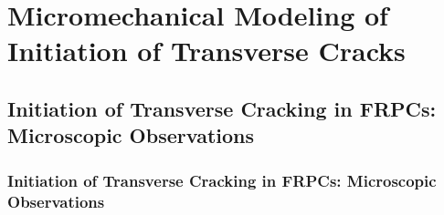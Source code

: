 \documentclass[first,firstsupp,lastsupp,last,hyperref,table]{ETHclass}
\begin{document}
\section[Initiation of Transverse Cracks]{Micromechanical Modeling of Initiation of Transverse Cracks}

\subsection[Microscopic Observations]{Initiation of Transverse Cracking in FRPCs: Microscopic Observations}

\begin{frame}
\frametitle{\vspace{0.3cm}\small Initiation of Transverse Cracking in FRPCs: Microscopic Observations}
\vspace{-0.5cm}
\centering
\captionsetup[subfigure]{labelfont=footnotesize}
\begin{tikzpicture}



\end{tikzpicture}
\end{frame}
\end{document}
